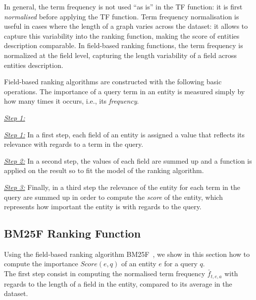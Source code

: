 In general, the term frequency is not used ``as is'' in the TF function: it is first \emph{normalised} before applying the TF function. Term frequency normalisation is useful in cases where the length of a graph varies across the dataset: it allows to capture this variability into the ranking function, making the score of entities description comparable. In field-based ranking functions, the term frequency is normalized at the field level, capturing the length variability of a field across entities description.


Field-based ranking algorithms are constructed with the following basic operations. The importance of a query term in an entity is measured simply by how many times it occurs, i.e., its \emph{frequency}.
\begin{labeling}{\textit{\underline{Step 1:}}}
	\item[\textit{\underline{Step 1:}}] In a first step, each field of an entity is assigned a value that reflects its relevance with regards to a term in the query.
	\item[\textit{\underline{Step 2:}}] In a second step, the values of each field are summed up and a function is applied on the result so to fit the model of the ranking algorithm.
	\item[\textit{\underline{Step 3:}}] Finally, in a third step the relevance of the entity for each term in the query are summed up in order to compute the \emph{score} of the entity, which represents how important the entity is with regards to the query.
\end{labeling}

\subsection{BM25F Ranking Function}

Using the field-based ranking algorithm BM25F~\cite{zaragoza:2004:microsoft}, we show in this section how to compute the importance $Score(e,q)$ of an entity $e$ for a query $q$.\\

The first step consist in computing the normalised term frequency $\bar{f}_{t,e,a}$ with regards to the length of a field in the entity, compared to its average in the dataset.

